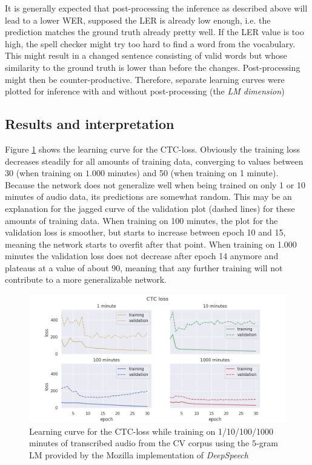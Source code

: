 It is generally expected that post-processing the inference as described above will lead to a lower \ac{WER}, supposed the \ac{LER} is already low enough, i.e. the prediction matches the ground truth already pretty well. If the \ac{LER} value is too high, the spell checker might try too hard to find a word from the vocabulary. This might result in a changed sentence consisting of valid words but whose similarity to the ground truth is lower than before the changes. Post-processing might then be counter-productive. Therefore, separate learning curves were plotted for inference with and without post-processing (the \textit{\ac{LM} dimension})

\subsection{Results and interpretation}

Figure \ref{lc_loss_cv} shows the learning curve for the \ac{CTC}-loss. Obviously the training loss decreases steadily for all amounts of training data, converging to values between 30 (when training on $1.000$ minutes) and 50 (when training on 1 minute). Because the network does not generalize well when being trained on only 1 or 10 minutes of audio data, its predictions are somewhat random. This may be an explanation for the jagged curve of the validation plot (dashed lines) for these amounts of training data. When training on 100 minutes, the plot for the validation loss is smoother, but starts to increase between epoch 10 and 15, meaning the network starts to overfit after that point. When training on 1.000 minutes the validation loss does not decrease after epoch 14 anymore and plateaus at a value of about 90, meaning that any further training will not contribute to a more generalizable network.

\begin{figure}[h!]
	\includegraphics[width=\linewidth]{./img/lc_loss_cv.png}
	\caption{Learning curve for the CTC-loss while training on 1/10/100/1000 minutes of transcribed audio from the \ac{CV} corpus using the $5$-gram \ac{LM} provided by the Mozilla implementation of \textit{DeepSpeech}}
	\label{lc_loss_cv}
\end{figure}

